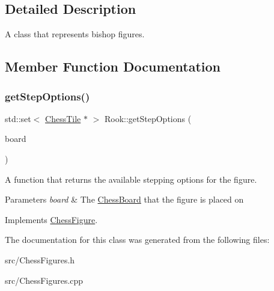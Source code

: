 \subsection{Detailed Description}
A class that represents bishop figures. 

\subsection{Member Function Documentation}
\mbox{\label{classRook_a466f48269ca58857c2a1ab1ab92c91f8}} 
\subsubsection{\texorpdfstring{get\+Step\+Options()}{getStepOptions()}}
{\footnotesize\ttfamily std\+::set$<$ \mbox{\hyperlink{classChessTile}{Chess\+Tile}} $\ast$ $>$ Rook\+::get\+Step\+Options (\begin{DoxyParamCaption}\item[{\mbox{\hyperlink{classChessBoard}{Chess\+Board}} \&}]{board }\end{DoxyParamCaption})\hspace{0.3cm}{\ttfamily [virtual]}}



A function that returns the available stepping options for the figure. 


\begin{DoxyParams}{Parameters}
{\em board} & The \mbox{\hyperlink{classChessBoard}{Chess\+Board}} that the figure is placed on \\
\hline
\end{DoxyParams}


Implements \mbox{\hyperlink{classChessFigure_ae78d52e35c4ea926f492d211c69758bd}{Chess\+Figure}}.



The documentation for this class was generated from the following files\+:\begin{DoxyCompactItemize}
\item 
src/Chess\+Figures.\+h\item 
src/Chess\+Figures.\+cpp\end{DoxyCompactItemize}
